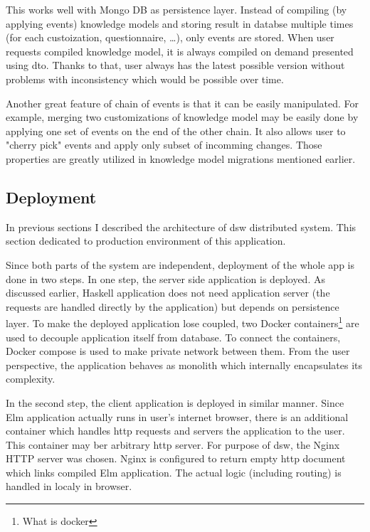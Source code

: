 This works well with Mongo DB as persistence layer.
Instead of compiling (by applying events) knowledge models and storing result in databse multiple times (for each custoization, questionnaire, \dots), only events are stored.
When user requests compiled knowledge model, it is always compiled on demand presented using dto.
Thanks to that, user always has the latest possible version without problems with inconsistency which would be possible over time.

Another great feature of chain of events is that it can be easily manipulated.
For example, merging two customizations of knowledge model may be easily done by applying one set of events on the end of the other chain.
It also allows user to "cherry pick" events and apply only subset of incomming changes.
Those properties are greatly utilized in knowledge model migrations mentioned earlier.

\subsection{Deployment}

In previous sections I described the architecture of \gls{dsw} distributed system.
This section dedicated to production environment of this application.

Since both parts of the system are independent, deployment of the whole app is done in two steps.
In one step, the server side application is deployed.
As discussed earlier, Haskell application does not need application server (the requests are handled directly by the application) but depends on persistence layer.
To make the deployed application lose coupled, two Docker containers\footnote{What is docker} are used to decouple application itself from database.
To connect the containers, Docker compose is used to make private network between them.
From the user perspective, the application behaves as monolith which internally encapsulates its complexity.

In the second step, the client application is deployed in similar manner.
Since Elm application actually runs in user's internet browser, there is an additional container which handles \gls{http} requests and servers the application to the user.
This container may ber arbitrary \gls{http} server.
For purpose of \gls{dsw}, the Nginx HTTP server was chosen.
Nginx is configured to return empty \gls{http} document which links compiled Elm application.
The actual logic (including routing) is handled in localy in browser.

